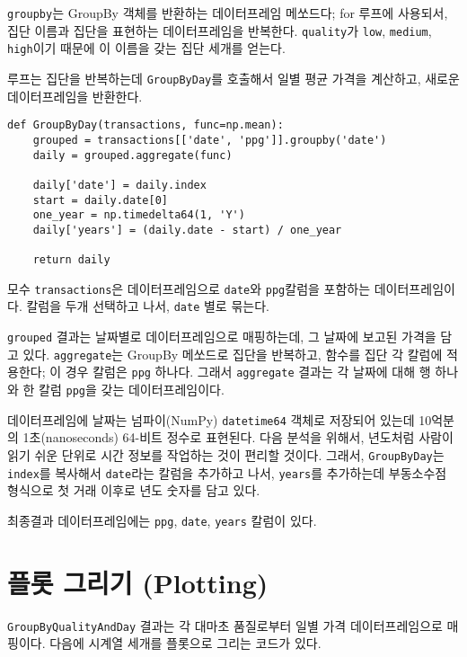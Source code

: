 {\tt groupby}는 GroupBy 객체를 반환하는 데이터프레임 메쏘드다; for 루프에 사용되서, 집단 이름과 집단을 표현하는 데이터프레임을 반복한다.
{\tt quality}가 {\tt low}, {\tt medium}, {\tt high}이기 때문에 이 이름을 갖는 집단 세개를 얻는다.

루프는 집단을 반복하는데 {\tt GroupByDay}를 호출해서 일별 평균 가격을 계산하고, 새로운 데이터프레임을 반환한다.

\begin{verbatim}
def GroupByDay(transactions, func=np.mean):
    grouped = transactions[['date', 'ppg']].groupby('date')
    daily = grouped.aggregate(func)

    daily['date'] = daily.index
    start = daily.date[0]
    one_year = np.timedelta64(1, 'Y')
    daily['years'] = (daily.date - start) / one_year

    return daily
\end{verbatim}

모수 {\tt transactions}은 데이터프레임으로 {\tt date}와 {\tt ppg}칼럼을 포함하는 데이터프레임이다. 칼럼을 두개 선택하고 나서, {\tt date} 별로 묶는다.

{\tt grouped} 결과는 날짜별로 데이터프레임으로 매핑하는데, 그 날짜에 보고된 가격을 담고 있다. {\tt aggregate}는 GroupBy 메쏘드로 집단을 반복하고, 함수를 집단 각 칼럼에 적용한다; 이 경우 칼럼은 {\tt ppg} 하나다.
그래서 {\tt aggregate} 결과는 각 날짜에 대해 행 하나와 한 칼럼 {\tt ppg}을 갖는 데이터프레임이다.

데이터프레임에 날짜는 넘파이(NumPy) {\tt datetime64} 객체로 저장되어 있는데 10억분의 1초(nanoseconds) 64-비트 정수로 표현된다.
다음 분석을 위해서, 년도처럼 사람이 읽기 쉬운 단위로 시간 정보를 작업하는 것이 편리할 것이다. 그래서, {\tt GroupByDay}는 {\tt index}를 복사해서 {\tt date}라는 칼럼을 추가하고 나서, {\tt years}를 추가하는데 부동소수점 형식으로 첫 거래 이후로 년도 숫자를 담고 있다.

최종결과 데이터프레임에는 {\tt ppg}, {\tt date}, {\tt years} 칼럼이 있다.


\section{플롯 그리기 (Plotting)}

{\tt GroupByQualityAndDay} 결과는 각 대마초 품질로부터 일별 가격 데이터프레임으로 매핑이다. 다음에 시계열 세개를 플롯으로 그리는 코드가 있다.

